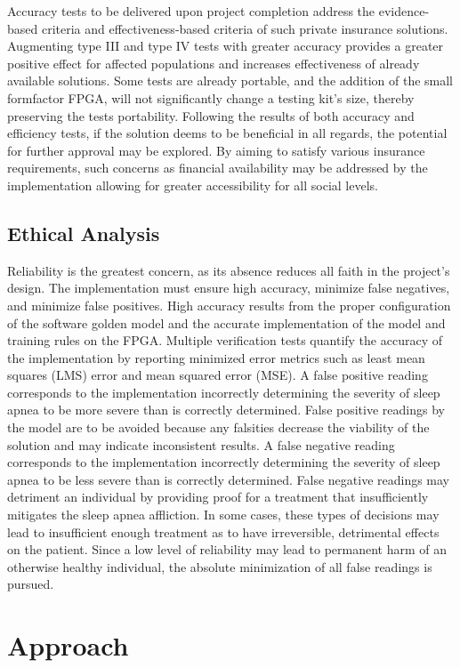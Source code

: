 \documentclass[12pt,titlepage]{article}
\begin{document}
Accuracy tests to be delivered upon project completion address the evidence-based criteria and effectiveness-based criteria of such private
insurance solutions. Augmenting type III and type IV tests with greater accuracy provides a greater positive effect for affected populations and
increases effectiveness of already available solutions. Some tests are already portable, and the addition of the small formfactor FPGA, will not
significantly change a testing kit’s size, thereby preserving the tests portability. Following the results of both accuracy and efficiency tests,
if the solution deems to be beneficial in all regards, the potential for further approval may be explored. By aiming to satisfy various insurance
requirements, such concerns as financial availability may be addressed by the implementation allowing for greater accessibility for all social levels. 


\subsection{Ethical Analysis}
Reliability is the greatest concern, as its absence reduces all faith in the project’s design. The implementation must ensure high accuracy,
minimize false negatives, and minimize false positives. High accuracy results from the proper configuration of the software golden model and the
accurate implementation of the model and training rules on the FPGA. Multiple verification tests quantify the accuracy of the implementation by
reporting minimized error metrics such as least mean squares (LMS) error and mean squared error (MSE). A false positive reading corresponds to the
implementation incorrectly determining the severity of sleep apnea to be more severe than is correctly determined. False positive readings by the
model are to be avoided because any falsities decrease the viability of the solution and may indicate inconsistent results. A false negative
reading corresponds to the implementation incorrectly determining the severity of sleep apnea to be less severe than is correctly determined.
False negative readings may detriment an individual by providing proof for a treatment that insufficiently mitigates the sleep apnea affliction.
In some cases, these types of decisions may lead to insufficient enough treatment as to have irreversible, detrimental effects on the patient.
Since a low level of reliability may lead to permanent harm of an otherwise healthy individual, the absolute minimization of all false readings
is pursued. 

\section{Approach}
\end{document}
